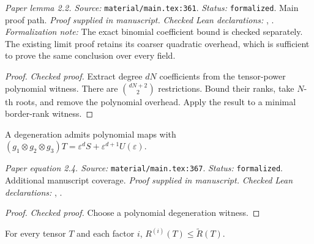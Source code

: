 \noindent\textit{Paper lemma 2.2. Source:} \texttt{material/main.tex:361}.
\textit{Status:} \texttt{formalized}. Main proof path.
\textit{Proof supplied in manuscript.}
\textit{Checked Lean declarations:} , .
\textit{Formalization note:} The exact binomial coefficient bound is checked separately. The existing limit proof retains its coarser quadratic overhead, which is sufficient to prove the same conclusion over every field.

\begin{proof}
\leanok
{}
\textit{Checked proof.} Extract degree $dN$ coefficients from the tensor-power polynomial witness. There are $\binom{dN+2}{2}$ restrictions. Bound their ranks, take $N$-th roots, and remove the polynomial overhead. Apply the result to a minimal border-rank witness.
\end{proof}

\renewcommand{\thetheorem}{2.4}
\begin{equationresult}
\label{eq:a-degen}
\manuscriptproof
{}
\leanok
A degeneration admits polynomial maps with $(g_1\otimes g_2\otimes g_3)T=\varepsilon^dS+\varepsilon^{d+1}U(\varepsilon)$.
\end{equationresult}

\noindent\textit{Paper equation 2.4. Source:} \texttt{material/main.tex:367}.
\textit{Status:} \texttt{formalized}. Additional manuscript coverage.
\textit{Proof supplied in manuscript.}
\textit{Checked Lean declarations:} , .

\begin{proof}
\leanok
{}
\textit{Checked proof.} Choose a polynomial degeneration witness.
\end{proof}

\renewcommand{\thetheorem}{2.3}
\begin{lemma}
\label{lem:flattening-lb}
\manuscriptproof
{}
\leanok
For every tensor $T$ and each factor $i$, $R^{(i)}(T)\le\widetilde R(T)$.
\end{lemma}

